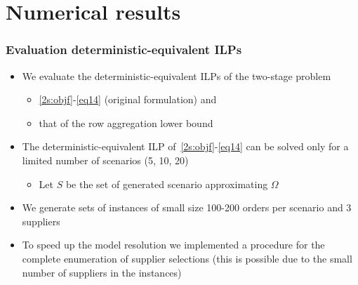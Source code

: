 \documentclass[9pt,xcolor={dvipsnames}]{beamer}
\begin{document}
\section {Numerical results}
\begin{frame}%
	\frametitle{Evaluation deterministic-equivalent ILPs}
	\begin{itemize}
		\item<1-> We evaluate the deterministic-equivalent ILPs of the two-stage problem
		\begin{itemize}
			\item<1-> \eqref{2s:objf}-\eqref{eq14} (original formulation) and
			\item<2-> that of the row aggregation lower bound
		\end{itemize}
		\bigskip
		\item<3-> The deterministic-equivalent ILP of~\eqref{2s:objf}-\eqref{eq14} can be solved only for a limited number of scenarios (5, 10, 20)
		\begin{itemize}
			\item<4-> Let $ S$ be the set of generated scenario approximating $\Omega$
		\end{itemize}
		\bigskip
		\item<5-> We generate sets of instances of small size 100-200 orders per scenario and 3 suppliers
		\bigskip
		\item<6-> To speed up the model resolution we implemented a procedure for the complete enumeration of supplier selections (this is possible due to the small number of suppliers in the instances)
	\end{itemize}
\end{frame}
\end{document}
